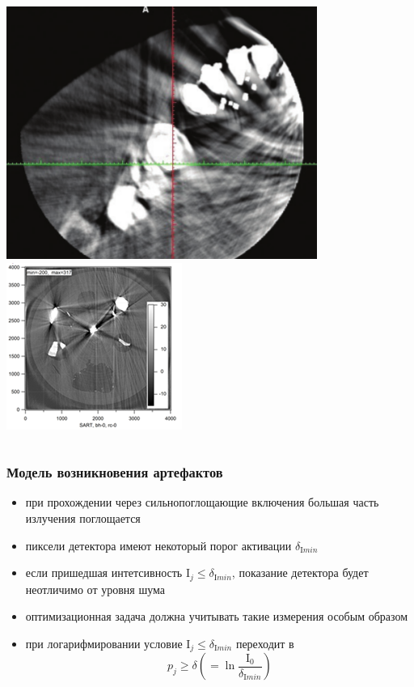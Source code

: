 \documentclass[12pt]{beamer}
\begin{document}
\begin{frame}
\begin{columns}[t]
\centering
\includegraphics[height=0.5\textheight]{../Dissertation/images/part2_img/tooth_artifacts_med_3}\\
\includegraphics[height=0.5\textheight]{high_absorb_artifacts}
\end{columns}

\end{frame}

\begin{frame}
\frametitle{Модель возникновения артефактов}
  \begin{itemize}[<+->]
    \item при прохождении через сильнопоглощающие включения большая часть излучения поглощается
    \item пиксели детектора имеют некоторый порог активации $\delta_{\mathrm I min}$
    \item если пришедшая интетсивность $\mathrm I_{j} \leq \delta_{\mathrm I min}$, показание детектора будет неотличимо от уровня шума
    \item оптимизационная задача должна учитывать такие измерения особым образом
    \item при логарифмировании условие $\mathrm I_{j} \leq \delta_{\mathrm I min}$ переходит в 
    \begin{equation}
      \label{eq:thresh}
      p_j \geq \delta \left( = \ln \frac {\mathrm I_0}{\delta_{\mathrm I min}}\right)
    \end{equation}
  \end{itemize}
\end{frame}
\end{document}
